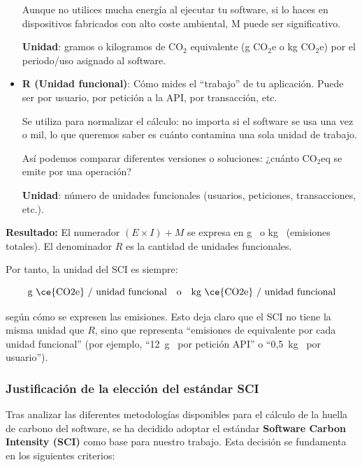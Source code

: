 \documentclass[12pt,a4paper]{report}
\begin{document}
\begin{itemize}
        Aunque no utilices mucha energía al ejecutar tu software, si lo haces en dispositivos fabricados con alto coste ambiental, M puede ser significativo.

        \textbf{Unidad}: gramos o kilogramos de CO$_2$ equivalente (g CO$_2$e o kg CO$_2$e) por el periodo/uso asignado al software.

  \item \textbf{R (Unidad funcional)}: Cómo mides el ``trabajo'' de tu aplicación. Puede ser por usuario, por petición a la API, por transacción, etc.

        Se utiliza para normalizar el cálculo: no importa si el software se usa una vez o mil, lo que queremos saber es cuánto contamina una sola unidad de trabajo.

        Así podemos comparar diferentes versiones o soluciones: ¿cuánto CO$_2$eq se emite por una operación?

        \textbf{Unidad}: número de unidades funcionales (usuarios, peticiones, transacciones, etc.).
\end{itemize}

\textbf{Resultado:} El numerador $(E \times I) + M$ se expresa en g~ o kg~ (emisiones totales). El denominador $R$ es la cantidad de unidades funcionales. 

Por tanto, la unidad del SCI es siempre:

\[
\text{g~\ce{CO2e} / unidad funcional} 
\quad \text{o} \quad 
\text{kg~\ce{CO2e} / unidad funcional}
\]

según cómo se expresen las emisiones. Esto deja claro que el SCI no tiene la misma unidad que $R$, sino que representa “emisiones de  equivalente por cada unidad funcional” (por ejemplo, ``12~g~ por petición API'' o ``0,5~kg~ por usuario'').

\subsubsection{Justificación de la elección del estándar SCI}

Tras analizar las diferentes metodologías disponibles para el cálculo de la huella de carbono del software, se ha decidido adoptar el estándar \textbf{Software Carbon Intensity (SCI)} como base para nuestro trabajo. Esta decisión se fundamenta en los siguientes criterios:
\end{document}
